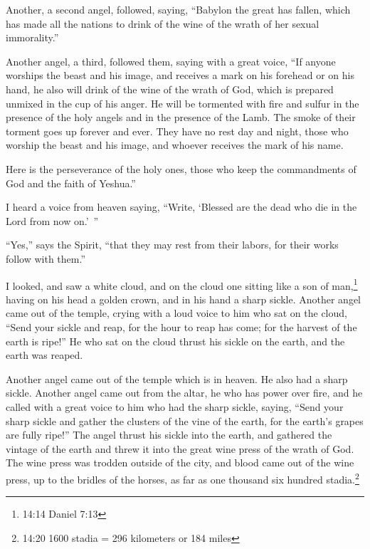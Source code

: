 \myverse{}Another, a second angel, followed, saying, “Babylon the great
has fallen, which has made all the nations to drink of the wine of the wrath of her sexual immorality.”

\myverse{}Another angel, a third, followed them, saying with a great voice,
“If anyone worships the beast and his image, and receives a mark on his forehead or on his hand,
\myverse{}he also will drink of the wine of the wrath of God, which is prepared unmixed
in the cup of his anger. He will be tormented with fire and sulfur in the presence of the holy angels
and in the presence of the Lamb.
\myverse{}The smoke of their torment goes up forever and ever. They have no rest day
and night, those who worship the beast and his image, and whoever receives the mark of his name.

\myverse{}Here is the perseverance of the holy ones, those who keep the
commandments of God and the faith of Yeshua.”

\myverse{}I heard a voice from heaven saying, “Write, ‘Blessed are the
dead who die in the Lord from now on.’ ”

“Yes,” says the Spirit, “that they may rest from their labors, for their works follow with
them.”

\myverse{}I looked, and saw a white cloud, and on the cloud one sitting
like a son of man,\footnote{ 14:14 Daniel 7:13} having on his head a golden crown, and in his
hand a sharp sickle.
\myverse{}Another angel came out of the temple, crying with a loud voice to him who
sat on the cloud, “Send your sickle and reap, for the hour to reap has come; for the harvest of the earth
is ripe!”
\myverse{}He who sat on the cloud thrust his sickle on the earth, and the earth was
reaped.

\myverse{}Another angel came out of the temple which is in heaven. He
also had a sharp sickle.
\myverse{}Another angel came out from the altar, he who has power over fire, and he
called with a great voice to him who had the sharp sickle, saying, “Send your sharp sickle and gather
the clusters of the vine of the earth, for the earth’s grapes are fully ripe!”
\myverse{}The angel thrust his sickle into the earth, and gathered the vintage of the
earth and threw it into the great wine press of the wrath of God.
\myverse{}The wine press was trodden outside of the city, and blood came out of the
wine press, up to the bridles of the horses, as far as one thousand six hundred stadia.\footnote{14:20 1600 stadia = 296 kilometers or 184 miles}



